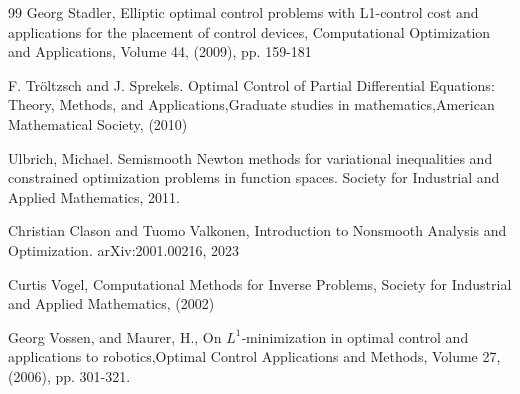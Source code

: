 \documentclass[11pt,a4paper]{amsart}
\begin{document}
\begin{thebibliography}{99}
Georg Stadler, Elliptic optimal control problems with L1-control cost and applications for the placement of control devices, Computational Optimization and Applications, Volume 44, (2009), pp. 159-181

  F. Tröltzsch and J. Sprekels. Optimal Control of Partial Differential Equations: Theory, Methods, and Applications,Graduate studies in mathematics,American Mathematical Society, (2010)


Ulbrich, Michael. Semismooth Newton methods for variational inequalities and constrained optimization problems in function spaces. Society for Industrial and Applied Mathematics, 2011.

Christian Clason and Tuomo Valkonen, Introduction to Nonsmooth Analysis and Optimization. 	arXiv:2001.00216, 2023

 Curtis Vogel, Computational Methods for Inverse Problems, Society for Industrial and Applied Mathematics, (2002)

 Georg Vossen, and Maurer, H., On $L^1$‐minimization in optimal control and applications to robotics,Optimal Control Applications and Methods, Volume 27, (2006), pp. 301-321.  
\end{thebibliography}
\end{document}
